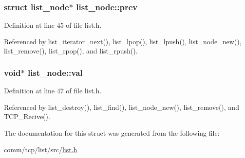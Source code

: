 \subsubsection[{\texorpdfstring{prev}{prev}}]{\setlength{\rightskip}{0pt plus 5cm}struct {\bf list\+\_\+node}$\ast$ list\+\_\+node\+::prev}\hypertarget{structlist__node_a30baba3b27442cbca9694076003ed65e}{}\label{structlist__node_a30baba3b27442cbca9694076003ed65e}


Definition at line 45 of file list.\+h.



Referenced by list\+\_\+iterator\+\_\+next(), list\+\_\+lpop(), list\+\_\+lpush(), list\+\_\+node\+\_\+new(), list\+\_\+remove(), list\+\_\+rpop(), and list\+\_\+rpush().

\subsubsection[{\texorpdfstring{val}{val}}]{\setlength{\rightskip}{0pt plus 5cm}void$\ast$ list\+\_\+node\+::val}\hypertarget{structlist__node_a129de89b4c110fa54377ef16ab128ce0}{}\label{structlist__node_a129de89b4c110fa54377ef16ab128ce0}


Definition at line 47 of file list.\+h.



Referenced by list\+\_\+destroy(), list\+\_\+find(), list\+\_\+node\+\_\+new(), list\+\_\+remove(), and T\+C\+P\+\_\+\+Recive().



The documentation for this struct was generated from the following file\+:\begin{DoxyCompactItemize}
\item 
comm/tcp/list/src/\hyperlink{list_8h}{list.\+h}\end{DoxyCompactItemize}
